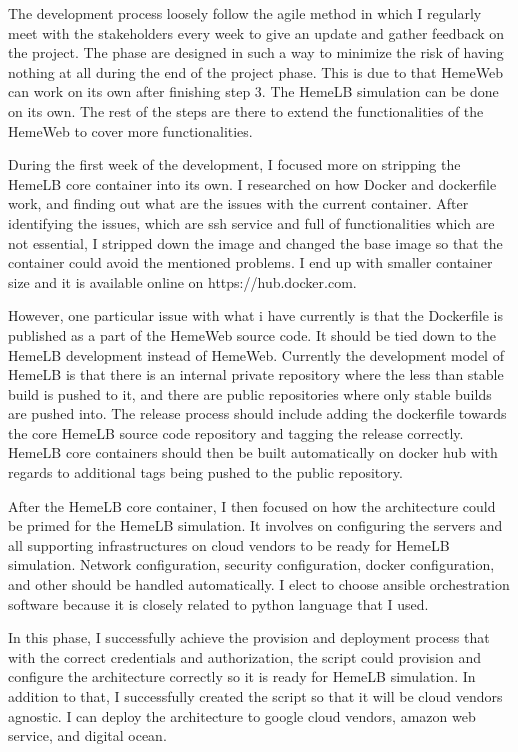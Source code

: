The development process loosely follow the agile method in which I regularly meet with the stakeholders every week to give an update and gather feedback on the project. The phase are designed in such a way to minimize the risk of having nothing at all during the end of the project phase. This is due to that HemeWeb can work on its own after finishing step 3. The HemeLB simulation can be done on its own. The rest of the steps are there to extend the functionalities of the HemeWeb to cover more functionalities.

During the first week of the development, I focused more on stripping the HemeLB core container into its own. I researched on how Docker and dockerfile work, and finding out what are the issues with the current container. After identifying the issues, which are ssh service and full of functionalities which are not essential, I stripped down the image and changed the base image so that the container could avoid the mentioned problems. I end up with smaller container size and it is available online on https://hub.docker.com.

However, one particular issue with what i have currently is that the Dockerfile is published as a part of the HemeWeb source code. It should be tied down to the HemeLB development instead of HemeWeb. Currently the development model of HemeLB is that there is an internal private repository where the less than stable build is pushed to it, and there are public repositories where only stable builds are pushed into. The release process should include adding the dockerfile towards the core HemeLB source code repository and tagging the release correctly. HemeLB core containers should then be built automatically on docker hub with regards to additional tags being pushed to the public repository.


After the HemeLB core container, I then focused on how the architecture could be primed for the HemeLB simulation. It involves on configuring the servers and all supporting infrastructures on cloud vendors to be ready for HemeLB simulation. Network configuration, security configuration, docker configuration, and other should be handled automatically. I elect to choose ansible orchestration software because it is closely related to python language that I used. 

In this phase, I successfully achieve the provision and deployment process that with the correct credentials and authorization, the script could provision and configure the architecture correctly so it is ready for HemeLB simulation. In addition to that, I successfully created the script so that it will be cloud vendors agnostic. I can deploy the architecture to google cloud vendors, amazon web service, and digital ocean.

